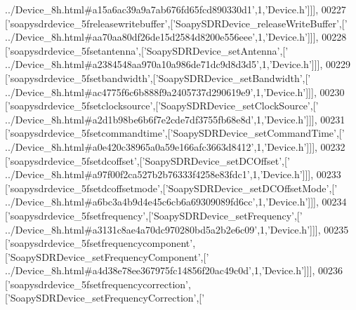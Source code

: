 \begin{DoxyCode}
{      ../Device\_8h.html#a15a6ac39a9a7ab676fd65fcd890330d1'},1,\textcolor{stringliteral}{'Device.h'}]]],
00227   [\textcolor{stringliteral}{'soapysdrdevice\_5freleasewritebuffer'},[\textcolor{stringliteral}{'SoapySDRDevice\_releaseWriteBuffer'},[\textcolor{stringliteral}{'
      ../Device\_8h.html#aa70aa80df26de15d2584d8200e556eee'},1,\textcolor{stringliteral}{'Device.h'}]]],
00228   [\textcolor{stringliteral}{'soapysdrdevice\_5fsetantenna'},[\textcolor{stringliteral}{'SoapySDRDevice\_setAntenna'},[\textcolor{stringliteral}{'
      ../Device\_8h.html#a2384548aa970a10a986de71dc9d8d3d5'},1,\textcolor{stringliteral}{'Device.h'}]]],
00229   [\textcolor{stringliteral}{'soapysdrdevice\_5fsetbandwidth'},[\textcolor{stringliteral}{'SoapySDRDevice\_setBandwidth'},[\textcolor{stringliteral}{'
      ../Device\_8h.html#ac4775f6c6b888f9a2405737d290619e9'},1,\textcolor{stringliteral}{'Device.h'}]]],
00230   [\textcolor{stringliteral}{'soapysdrdevice\_5fsetclocksource'},[\textcolor{stringliteral}{'SoapySDRDevice\_setClockSource'},[\textcolor{stringliteral}{'
      ../Device\_8h.html#a2d1b98be6b6f7e2cde7df3755fb68e8d'},1,\textcolor{stringliteral}{'Device.h'}]]],
00231   [\textcolor{stringliteral}{'soapysdrdevice\_5fsetcommandtime'},[\textcolor{stringliteral}{'SoapySDRDevice\_setCommandTime'},[\textcolor{stringliteral}{'
      ../Device\_8h.html#a0e420c38965a0a59e166afc3663d8412'},1,\textcolor{stringliteral}{'Device.h'}]]],
00232   [\textcolor{stringliteral}{'soapysdrdevice\_5fsetdcoffset'},[\textcolor{stringliteral}{'SoapySDRDevice\_setDCOffset'},[\textcolor{stringliteral}{'
      ../Device\_8h.html#a97f00f2ca527b2b76333f4258e83fdc1'},1,\textcolor{stringliteral}{'Device.h'}]]],
00233   [\textcolor{stringliteral}{'soapysdrdevice\_5fsetdcoffsetmode'},[\textcolor{stringliteral}{'SoapySDRDevice\_setDCOffsetMode'},[\textcolor{stringliteral}{'
      ../Device\_8h.html#a6bc3a4b9d4e45c6cb6a69309089fd6cc'},1,\textcolor{stringliteral}{'Device.h'}]]],
00234   [\textcolor{stringliteral}{'soapysdrdevice\_5fsetfrequency'},[\textcolor{stringliteral}{'SoapySDRDevice\_setFrequency'},[\textcolor{stringliteral}{'
      ../Device\_8h.html#a3131c8ae4a70dc970280bd5a2b2e6c09'},1,\textcolor{stringliteral}{'Device.h'}]]],
00235   [\textcolor{stringliteral}{'soapysdrdevice\_5fsetfrequencycomponent'},[\textcolor{stringliteral}{'SoapySDRDevice\_setFrequencyComponent'},[\textcolor{stringliteral}{'
      ../Device\_8h.html#a4d38e78ee367975fc14856f20ac49c0d'},1,\textcolor{stringliteral}{'Device.h'}]]],
00236   [\textcolor{stringliteral}{'soapysdrdevice\_5fsetfrequencycorrection'},[\textcolor{stringliteral}{'SoapySDRDevice\_setFrequencyCorrection'},[\textcolor{stringliteral}{'
}
\end{DoxyCode}
